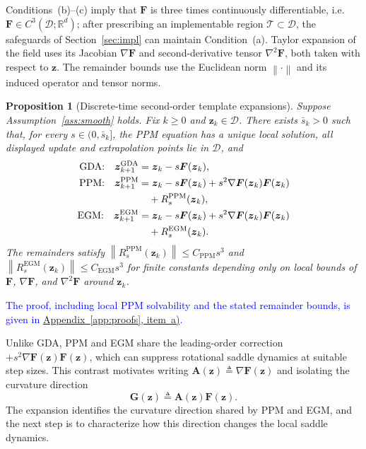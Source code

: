 \documentclass[journal]{IEEEtran}
\newtheorem{proposition}{Proposition}
\theoremstyle{remark}
\newcommand{\R}{\mathbb{R}}
\newcommand{\norm}[1]{\left\lVert #1\right\rVert}
\newcommand{\cD}{\mathcal{D}}
\newcommand{\bz}{\boldsymbol{z}}
\newcommand{\bA}{\boldsymbol{A}}
\newcommand{\bF}{\boldsymbol{F}}
\newcommand{\bG}{\boldsymbol{G}}
\begin{document}
	Conditions~(b)--(c) imply that $\bF$ is three times continuously differentiable, i.e. $\bF\in C^{3}(\cD;\R^{d})$; after prescribing an implementable region $\mathcal T\subset\cD$, the safeguards of Section~\ref{sec:impl} can maintain Condition~(a).
	Taylor expansion of the field uses its Jacobian $\nabla\bF$ and second-derivative tensor $\nabla^2\bF$, both taken with respect to $\bz$.
	The remainder bounds use the Euclidean norm $\norm{\cdot}$ and its induced operator and tensor norms.
	
	\begin{proposition}[Discrete-time second-order template expansions]\label{prop:DTA}
		Suppose Assumption~\ref{ass:smooth} holds.
		Fix $k\ge0$ and $\bz_k\in\cD$.
		There exists $\bar s_k>0$ such that, for every $s\in(0,\bar s_k]$, the PPM equation has a unique local solution, all displayed update and extrapolation points lie in $\cD$, and
		\begin{align*}
			\textnormal{GDA:}\quad \bz_{k+1}^{\rm GDA}
			&=\bz_k-s\bF(\bz_k),\\
			\textnormal{PPM:}\quad \bz_{k+1}^{\rm PPM}
			&=\bz_k-s\bF(\bz_k)+s^{2}\nabla\bF(\bz_k)\bF(\bz_k)\\
			&\quad{}+R^{\mathrm{PPM}}_{s}(\bz_k),\\
			\textnormal{EGM:}\quad \bz_{k+1}^{\rm EGM}
			&=\bz_k-s\bF(\bz_k)+s^{2}\nabla\bF(\bz_k)\bF(\bz_k)\\
			&\quad{}+R^{\mathrm{EGM}}_{s}(\bz_k).
		\end{align*}
		The remainders satisfy $\norm{R^{\mathrm{PPM}}_{s}(\bz_k)}\le C_{\mathrm{PPM}}s^{3}$ and $\norm{R^{\mathrm{EGM}}_{s}(\bz_k)}\le C_{\mathrm{EGM}}s^{3}$ for finite constants depending only on local bounds of $\bF$, $\nabla\bF$, and $\nabla^{2}\bF$ around $\bz_k$.
	\end{proposition}
\textcolor{blue}{The proof, including local PPM solvability and the stated remainder bounds, is given in \hyperref[app:DTA]{Appendix~\ref*{app:proofs}, item~a)}.}
	
	Unlike GDA, PPM and EGM share the leading-order correction $+s^{2}\nabla\bF(\bz)\bF(\bz)$, which can suppress rotational saddle dynamics at suitable step sizes.
	This contrast motivates writing $\bA(\bz)\triangleq\nabla\bF(\bz)$ and isolating the curvature direction
	\begin{equation}\label{eq:curvature_direction}
		\bG(\bz)\triangleq\bA(\bz)\bF(\bz).
	\end{equation}
	The expansion identifies the curvature direction shared by PPM and EGM, and the next step is to characterize how this direction changes the local saddle dynamics.
	
\end{document}

